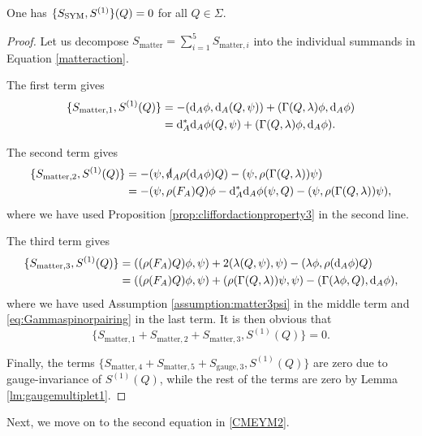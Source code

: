 \documentclass[10pt, oneside]{article}
\newcommand{\gauge}{\mathrm{gauge}}
\newcommand{\matter}{\mathrm{matter}}
\begin{document}
\begin{lemma} \label{lem:YM1}
One has $\{S_{\rm SYM}, S^{(1)}\} (Q) = 0$ for all $Q \in \Sigma$. 
\end{lemma}
\begin{proof}
Let us decompose $S_{\matter}=\sum_{i=1}^5 S_{\matter, i}$ into the individual summands in Equation \eqref{matteraction}. 

The first term gives
\begin{align*}
\{S_{\matter,1}, S^{(1)}(Q)\} &= -(\d_A\phi, \d_A(Q, \psi)) + (\Gamma(Q, \lambda)\phi, \d_A\phi) \\
&= \d_A^* \d_A\phi (Q, \psi) + (\Gamma(Q, \lambda)\phi, \d_A\phi).
\end{align*}

The second term gives
\begin{align*}
\{S_{\matter,2}, S^{(1)}(Q)\} &= -(\psi, \sd \d_A \rho(\d_A \phi) Q) - (\psi, \rho(\Gamma(Q, \lambda))\psi) \\
&= -(\psi, \rho(F_A) Q)\phi - \d_A^*\d_A \phi(\psi, Q) - (\psi, \rho(\Gamma(Q, \lambda))\psi),
\end{align*}
where we have used Proposition \ref{prop:cliffordactionproperty3} in the second line.

The third term gives
\begin{align*}
\{S_{\matter,3}, S^{(1)}(Q)\} &= ((\rho(F_A)Q) \phi, \psi) + 2(\lambda(Q, \psi), \psi) - (\lambda\phi, \rho(\d_A \phi) Q) \\
&= ((\rho(F_A)Q) \phi, \psi) + (\rho(\Gamma(Q, \lambda))\psi, \psi) - (\Gamma(\lambda\phi, Q), \d_A \phi),
\end{align*}
where we have used Assumption \ref{assumption:matter3psi} in the middle term and \eqref{eq:Gammaspinorpairing} in the last term. It is then obvious that
\[\{S_{\matter,1} + S_{\matter,2} + S_{\matter,3}, S^{(1)}(Q)\} = 0.\]

Finally, the terms $\{S_{\matter,4} + S_{\matter,5} + S_{\gauge,3}, S^{(1)}(Q)\}$ are zero due to gauge-invariance of $S^{(1)}(Q)$, while the rest of the terms are zero by Lemma \ref{lm:gaugemultiplet1}.
\end{proof}

Next, we move on to the second equation in \eqref{CMEYM2}.
\end{document}
